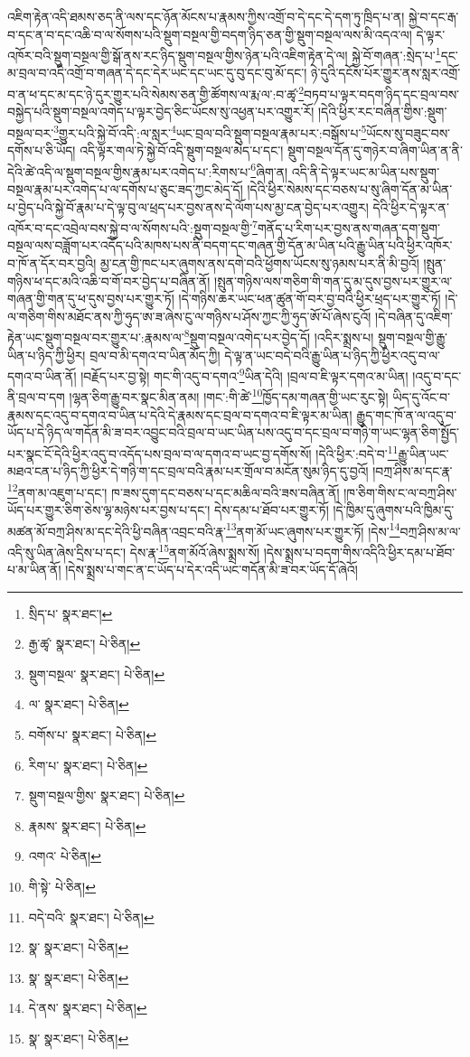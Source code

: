 འཇིག་རྟེན་འདི་ཐམས་ཅད་ནི་ལས་དང་ཉོན་མོངས་པ་རྣམས་ཀྱིས་འགྲོ་བ་དེ་དང་དེ་དག་ཏུ་ཁྲིད་པ་ན། སྐྱེ་བ་དང་རྒ་བ་དང་ན་བ་དང་འཆི་བ་ལ་སོགས་པའི་སྡུག་བསྔལ་གྱི་བདག་ཉིད་ཅན་གྱི་སྡུག་བསྔལ་ལས་མི་འདའ་ལ། དེ་ལྟར་འཁོར་བའི་སྡུག་བསྔལ་གྱི་སྒོ་ནས་རང་ཉིད་སྡུག་བསྔལ་གྱིས་ཉེན་པའི་འཇིག་རྟེན་དེ་ལ། སྐྱེ་བོ་གཞན་:སྲེད་པ་\footnote{སྲིད་པ་  སྣར་ཐང་། }དང་མ་བྲལ་བ་འདི་འགྲོ་བ་གཞན་དེ་དང་དེར་ཡང་དང་ཡང་དུ་བུ་དང་བུ་མོ་དང་། ཉེ་དུའི་དངོས་པོར་གྱུར་ནས་སླར་འགྲོ་བ་ན་ཕ་དང་མ་དང་ཉེ་དུར་གྱུར་པའི་སེམས་ཅན་གྱི་ཚོགས་ལ་རྨ་ལ་:བ་ཚྭ་\footnote{རྒྱ་ཚྭ་  སྣར་ཐང་།  པེ་ཅིན། }བཏབ་པ་ལྟར་བདག་ཉིད་དང་བྲལ་བས་བསྐྱེད་པའི་སྡུག་བསྔལ་འགེད་པ་ལྟར་བྱེད་ཅིང་ཡོངས་སུ་འཕྱན་པར་འགྱུར་རོ། །དེའི་ཕྱིར་རང་བཞིན་གྱིས་:སྡུག་བསྔལ་བར་\footnote{སྡུག་བསྔལ་  སྣར་ཐང་།  པེ་ཅིན། }གྱུར་པའི་སྐྱེ་བོ་འདི་:ལ་སླར་\footnote{ལ་  སྣར་ཐང་།  པེ་ཅིན། }ཡང་བྲལ་བའི་སྡུག་བསྔལ་རྣམ་པར་:བསྒོས་པ་\footnote{བགོས་པ་  སྣར་ཐང་།  པེ་ཅིན། }ཡོངས་སུ་བཟུང་བས་དགོས་པ་ཅི་ཡོད། འདི་ལྟར་གལ་ཏེ་སྐྱེ་བོ་འདི་སྡུག་བསྔལ་མེད་པ་དང་། སྡུག་བསྔལ་དོན་དུ་གཉེར་བ་ཞིག་ཡིན་ན་ནི་དེའི་ཚེ་འདི་ལ་སྡུག་བསྔལ་གྱིས་རྣམ་པར་འགེད་པ་:རིགས་པ་\footnote{རིག་པ་  སྣར་ཐང་།  པེ་ཅིན། }ཞིག་ན། འདི་ནི་དེ་ལྟར་ཡང་མ་ཡིན་པས་སྡུག་བསྔལ་རྣམ་པར་འགེད་པ་ལ་དགོས་པ་ཅུང་ཟད་ཀྱང་མེད་དོ། །དེའི་ཕྱིར་སེམས་དང་བཅས་པ་སུ་ཞིག་དོན་མ་ཡིན་པ་བྱེད་པའི་སྐྱེ་བོ་རྣམ་པ་དེ་ལྟ་བུ་ལ་ཕྲད་པར་བྱས་ནས་དེ་ལོག་པས་མྱ་ངན་བྱེད་པར་འགྱུར། དེའི་ཕྱིར་དེ་ལྟར་ན་འཁོར་བ་དང་འབྲེལ་བས་སྐྱེ་བ་ལ་སོགས་པའི་:སྡུག་བསྔལ་གྱི་\footnote{སྡུག་བསྔལ་གྱིས་  སྣར་ཐང་།  པེ་ཅིན། }གནོད་པ་རིག་པར་བྱས་ནས་གཞན་དག་སྡུག་བསྔལ་ལས་བཟློག་པར་འདོད་པའི་མཁས་པས་ནི་བདག་དང་གཞན་གྱི་དོན་མ་ཡིན་པའི་རྒྱུ་ཡིན་པའི་ཕྱིར་འཁོར་བ་ཁོ་ན་དོར་བར་བྱའི། མྱ་ངན་གྱི་ཁང་པར་ཞུགས་ནས་དགེ་བའི་ཕྱོགས་ཡོངས་སུ་ཉམས་པར་ནི་མི་བྱའོ། །སྤུན་གཉིས་ཕ་དང་མའི་འཆི་བ་གོ་བར་བྱེད་པ་བཞིན་ནོ། །སྤུན་གཉིས་ལས་གཅིག་གི་གན་དུ་མ་དུས་བྱས་པར་གྱུར་ལ་གཞན་གྱི་གན་དུ་ཕ་དུས་བྱས་པར་གྱུར་ཏོ། །དེ་གཉིས་ཆར་ཡང་ཕན་ཚུན་གོ་བར་བྱ་བའི་ཕྱིར་ཕྲད་པར་གྱུར་ཏོ། །དེ་ལ་གཅིག་གིས་མཐོང་ནས་ཀྱི་ཧུད་ཨ་ཟ་ཞེས་ངུ་ལ་གཉིས་པ་ཤོས་ཀྱང་ཀྱི་ཧུད་ཨོ་པོ་ཞེས་ངུའོ། །དེ་བཞིན་དུ་འཇིག་རྟེན་ཡང་སྡུག་བསྔལ་བར་གྱུར་པ་:རྣམས་ལ་\footnote{རྣམས་  སྣར་ཐང་།  པེ་ཅིན། }སྡུག་བསྔལ་འགེད་པར་བྱེད་དོ། །འདིར་སྨྲས་པ། སྡུག་བསྔལ་གྱི་རྒྱུ་ཡིན་པ་ཉིད་ཀྱི་ཕྱིར། བྲལ་བ་མི་དགའ་བ་ཡིན་མོད་ཀྱི། དེ་ལྟ་ན་ཡང་བདེ་བའི་རྒྱུ་ཡིན་པ་ཉིད་ཀྱི་ཕྱིར་འདུ་བ་ལ་དགའ་བ་ཡིན་ནོ། །བརྗོད་པར་བྱ་སྟེ། གང་གི་འདུ་བ་དགའ་\footnote{འགའ་  པེ་ཅིན། }ཡིན་དེའི། །བྲལ་བ་ཇི་ལྟར་དགའ་མ་ཡིན། །འདུ་བ་དང་ནི་བྲལ་བ་དག །ལྷན་ཅིག་རྒྱུ་བར་སྣང་མིན་ནམ། །གང་:གི་ཚེ་\footnote{གི་སྟེ་  པེ་ཅིན། }ཁྱོད་དམ་གཞན་གྱི་ཡང་རུང་སྟེ། ཡིད་དུ་འོང་བ་རྣམས་དང་འདུ་བ་དགའ་བ་ཡིན་པ་དེའི་དེ་རྣམས་དང་བྲལ་བ་དགའ་བ་ཇི་ལྟར་མ་ཡིན། རྒྱུད་གང་ཁོ་ན་ལ་འདུ་བ་ཡོད་པ་དེ་ཉིད་ལ་གདོན་མི་ཟ་བར་འབྱུང་བའི་བྲལ་བ་ཡང་ཡིན་པས་འདུ་བ་དང་བྲལ་བ་གཉི་ག་ཡང་ལྷན་ཅིག་སྤྱོད་པར་སྣང་ངོ་དེའི་ཕྱིར་འདུ་བ་འདོད་པས་བྲལ་བ་ལ་དགའ་བ་ཡང་བྱ་དགོས་སོ། །དེའི་ཕྱིར་:བདེ་བ་\footnote{བདེ་བའི་  སྣར་ཐང་།  པེ་ཅིན། }རྒྱུ་ཡིན་ཡང་མཐའ་ངན་པ་ཉིད་ཀྱི་ཕྱིར་དེ་གཉི་ག་དང་བྲལ་བའི་རྣམ་པར་གྲོལ་བ་མངོན་སུམ་ཉིད་དུ་བྱའོ། །བཀྲ་ཤིས་མ་དང་རྣ་\footnote{སྣ་  སྣར་ཐང་།  པེ་ཅིན། }ནག་མ་འཇུག་པ་དང་། ཁ་ཟས་དུག་དང་བཅས་པ་དང་མཆིལ་བའི་ཟས་བཞིན་ནོ། །ཁ་ཅིག་གིས་ང་ལ་བཀྲ་ཤིས་ཡོད་པར་གྱུར་ཅིག་ཅེས་ལྷ་མཉེས་པར་བྱས་པ་དང་། དེས་དམ་པ་ཐོབ་པར་གྱུར་ཏོ། །དེ་ཁྱིམ་དུ་ཞུགས་པའི་ཁྱིམ་དུ་མཚན་མོ་བཀྲ་ཤིས་མ་དང་དེའི་ཕྱི་བཞིན་འབྲང་བའི་རྣ་\footnote{སྣ་  སྣར་ཐང་།  པེ་ཅིན། }ནག་མོ་ཡང་ཞུགས་པར་གྱུར་ཏོ། །དེས་\footnote{དེ་ནས་  སྣར་ཐང་།  པེ་ཅིན། }བཀྲ་ཤིས་མ་ལ་འདི་སུ་ཡིན་ཞེས་དྲིས་པ་དང་། དེས་རྣ་\footnote{སྣ་  སྣར་ཐང་།  པེ་ཅིན། }ནག་མོའོ་ཞེས་སྨྲས་སོ། །དེས་སྨྲས་པ་བདག་གིས་འདིའི་ཕྱིར་དམ་པ་ཐོབ་པ་མ་ཡིན་ནོ། །དེས་སྨྲས་པ་གང་ན་ང་ཡོད་པ་དེར་འདི་ཡང་གདོན་མི་ཟ་བར་ཡོད་དོ་ཞེའོ། 